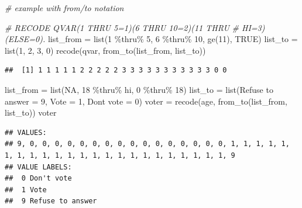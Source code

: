 \documentclass[
]{book}
\newenvironment{Shaded}{\begin{snugshade}}{\end{snugshade}}
\newcommand{\AttributeTok}[1]{\textcolor[rgb]{0.77,0.63,0.00}{#1}}
\newcommand{\CommentTok}[1]{\textcolor[rgb]{0.56,0.35,0.01}{\textit{#1}}}
\newcommand{\ConstantTok}[1]{\textcolor[rgb]{0.00,0.00,0.00}{#1}}
\newcommand{\DecValTok}[1]{\textcolor[rgb]{0.00,0.00,0.81}{#1}}
\newcommand{\FunctionTok}[1]{\textcolor[rgb]{0.00,0.00,0.00}{#1}}
\newcommand{\NormalTok}[1]{#1}
\newcommand{\OtherTok}[1]{\textcolor[rgb]{0.56,0.35,0.01}{#1}}
\newcommand{\SpecialCharTok}[1]{\textcolor[rgb]{0.00,0.00,0.00}{#1}}
\newcommand{\StringTok}[1]{\textcolor[rgb]{0.31,0.60,0.02}{#1}}
\begin{document}
\begin{Shaded}
\begin{Highlighting}[]
\CommentTok{\# example with from/to notation}

\CommentTok{\# RECODE QVAR(1 THRU 5=1)(6 THRU 10=2)(11 THRU}
\CommentTok{\# HI=3)(ELSE=0).}
\NormalTok{list\_from }\OtherTok{=} \FunctionTok{list}\NormalTok{(}\DecValTok{1} \SpecialCharTok{\%thru\%} \DecValTok{5}\NormalTok{, }\DecValTok{6} \SpecialCharTok{\%thru\%} \DecValTok{10}\NormalTok{, }\FunctionTok{ge}\NormalTok{(}\DecValTok{11}\NormalTok{), }\ConstantTok{TRUE}\NormalTok{)}
\NormalTok{list\_to }\OtherTok{=} \FunctionTok{list}\NormalTok{(}\DecValTok{1}\NormalTok{, }\DecValTok{2}\NormalTok{, }\DecValTok{3}\NormalTok{, }\DecValTok{0}\NormalTok{)}
\FunctionTok{recode}\NormalTok{(qvar, }\FunctionTok{from\_to}\NormalTok{(list\_from, list\_to))}
\end{Highlighting}
\end{Shaded}

\begin{verbatim}
##  [1] 1 1 1 1 1 2 2 2 2 2 3 3 3 3 3 3 3 3 3 3 3 0 0
\end{verbatim}

\begin{Shaded}
\begin{Highlighting}[]
\NormalTok{list\_from }\OtherTok{=} \FunctionTok{list}\NormalTok{(}\ConstantTok{NA}\NormalTok{, }\DecValTok{18} \SpecialCharTok{\%thru\%}\NormalTok{ hi, }\DecValTok{0} \SpecialCharTok{\%thru\%} \DecValTok{18}\NormalTok{)}
\NormalTok{list\_to }\OtherTok{=} \FunctionTok{list}\NormalTok{(}\StringTok{\textasciigrave{}}\AttributeTok{Refuse to answer}\StringTok{\textasciigrave{}} \OtherTok{=} \DecValTok{9}\NormalTok{, }\AttributeTok{Vote =} \DecValTok{1}\NormalTok{, }\StringTok{\textasciigrave{}}\AttributeTok{Don\textquotesingle{}t vote}\StringTok{\textasciigrave{}} \OtherTok{=} \DecValTok{0}\NormalTok{)}
\NormalTok{voter }\OtherTok{=} \FunctionTok{recode}\NormalTok{(age, }\FunctionTok{from\_to}\NormalTok{(list\_from, list\_to))}
\NormalTok{voter}
\end{Highlighting}
\end{Shaded}

\begin{verbatim}
## VALUES:
## 9, 0, 0, 0, 0, 0, 0, 0, 0, 0, 0, 0, 0, 0, 0, 0, 0, 1, 1, 1, 1, 1, 1, 1, 1, 1, 1, 1, 1, 1, 1, 1, 1, 1, 1, 1, 1, 1, 1, 1, 9
## VALUE LABELS:                   
##  0 Don't vote      
##  1 Vote            
##  9 Refuse to answer
\end{verbatim}
\end{document}
